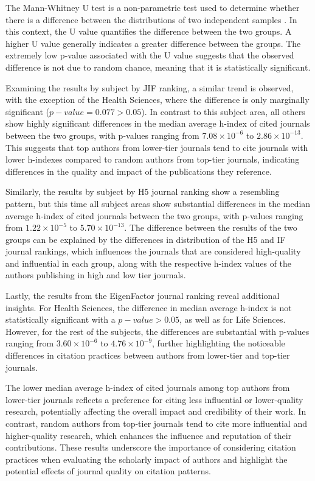 The Mann-Whitney U test is a non-parametric test used to determine whether
there is a difference between the distributions of two independent samples
\cite{mann1947test}. In this context, the U value quantifies the difference
between the two groups. A higher U value generally indicates a greater
difference between the groups. The extremely low p-value associated with the U
value suggests that the observed difference is not due to random chance,
meaning that it is statistically significant.

Examining the results by subject by JIF ranking, a similar trend is observed,
with the exception of the Health Sciences, where the difference is only
marginally significant ($p-value = 0.077 > 0.05$). In contrast to this subject
area, all others show highly significant differences in the median average
h-index of cited journals between the two groups, with p-values ranging from
$7.08 \times 10^{-6}$ to $2.86 \times 10^{-13}$. This suggests that top authors
from lower-tier journals tend to cite journals with lower h-indexes compared to
random authors from top-tier journals, indicating differences in the quality
and impact of the publications they reference.

Similarly, the results by subject by H5 journal ranking show a resembling
pattern, but this time all subject areas show substantial differences in the
median average h-index of cited journals between the two groups, with p-values
ranging from $1.22 \times 10^{-5}$ to $5.70 \times 10^{-13}$. The difference
between the results of the two groups can be explained by the differences in
distribution of the H5 and IF journal rankings, which influences the journals
that are considered high-quality and influential in each group, along with the
respective h-index values of the authors publishing in high and low tier
journals.

Lastly, the results from the EigenFactor journal ranking reveal additional
insights. For Health Sciences, the difference in median average h-index is not
statistically significant with a $p-value > 0.05$, as well as for Life
Sciences. However, for the rest of the subjects, the differences are
substantial with p-values ranging from $3.60 \times 10^{-6}$ to $4.76 \times
    10^{-9}$, further highlighting the noticeable differences in citation practices
between authors from lower-tier and top-tier journals.

The lower median average h-index of cited journals among top authors from
lower-tier journals reflects a preference for citing less influential or
lower-quality research, potentially affecting the overall impact and
credibility of their work. In contrast, random authors from top-tier journals
tend to cite more influential and higher-quality research, which enhances the
influence and reputation of their contributions. These results underscore the
importance of considering citation practices when evaluating the scholarly
impact of authors and highlight the potential effects of journal quality on
citation patterns.

